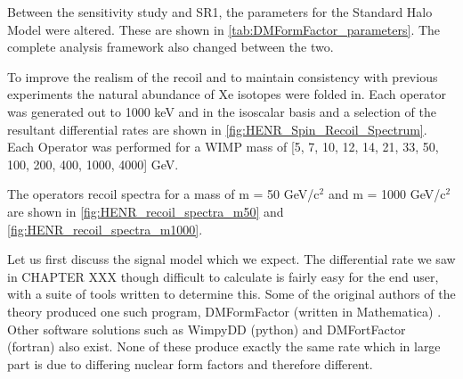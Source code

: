 \par
Between the sensitivity study and SR1, the parameters for the Standard Halo Model were altered.
These are shown in \autoref{tab:DMFormFactor_parameters}.
The complete analysis framework also changed between the two.


To improve the realism of the recoil and to maintain consistency with previous experiments the natural abundance of Xe isotopes were folded in.
Each operator was generated out to 1000 keV and in the isoscalar basis and a selection of the resultant differential rates are shown in \autoref{fig:HENR_Spin_Recoil_Spectrum}.
Each Operator was performed for a WIMP mass of [5, 7, 10, 12, 14, 21, 33, 50, 100, 200, 400, 1000, 4000] GeV.


\par
The operators recoil spectra for a mass of m = 50 GeV/c$^2$ and m = 1000 GeV/c$^2$ are shown in \autoref{fig:HENR_recoil_spectra_m50} and \autoref{fig:HENR_recoil_spectra_m1000}.



\par
Let us first discuss the signal model which we expect.
The differential rate we saw in CHAPTER XXX though difficult to calculate is fairly easy for the end user, with a suite of tools written to determine this.
Some of the original authors of the theory produced one such program, DMFormFactor (written in Mathematica) \cite{dmformfactor_ref}.
Other software solutions such as WimpyDD (python) and DMFortFactor (fortran) also exist.
None of these produce exactly the same rate which in large part is due to differing nuclear form factors and therefore different.


